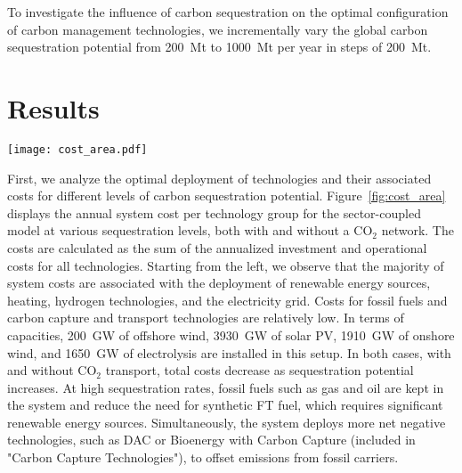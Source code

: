 \documentclass[conference]{IEEEtran}
\newcommand{\carbon}{CO$_2$ }
\begin{document}
To investigate the influence of carbon sequestration on the optimal configuration of carbon management technologies, we incrementally vary the global carbon sequestration potential from 200~Mt to 1000~Mt per year in steps of 200~Mt.

\section{Results}
\label{sec:results}

\begin{figure*}[hbt]
    \centering
    \texttt{[image: cost\_area.pdf]}
    \caption[short]{Total annual system cost for the sector-coupled system with different levels of carbon sequestration potential, with (left) and without (right) \carbon network. When increasing the annual sequestration of from 200~Mt to 1000~Mt, the system cost reduce up to 10\% in case of a network with \carbon transport. Due to an increased flexibility from fossil carriers with subsequent sequestration, the need for FT synthesis and H$_2$ electrolysis and the corresponding renewable power supply is reduced. }
    \label{fig:cost_area}
\end{figure*}

First, we analyze the optimal deployment of technologies and their associated costs for different levels of carbon sequestration potential. Figure~\ref{fig:cost_area} displays the annual system cost per technology group for the sector-coupled model at various sequestration levels, both with and without a \carbon network. The costs are calculated as the sum of the annualized investment and operational costs for all technologies. Starting from the left, we observe that the majority of system costs are associated with the deployment of renewable energy sources, heating, hydrogen technologies, and the electricity grid. Costs for fossil fuels and carbon capture and transport technologies are relatively low. In terms of capacities, 200~GW of offshore wind, 3930~GW of solar PV, 1910~GW of onshore wind, and 1650~GW of electrolysis are installed in this setup.
In both cases, with and without \carbon transport, total costs decrease as sequestration potential increases. At high sequestration rates, fossil fuels such as gas and oil are kept in the system and reduce the need for synthetic FT fuel, which requires significant renewable energy sources. Simultaneously, the system deploys more net negative technologies, such as DAC or Bioenergy with Carbon Capture (included in "Carbon Capture Technologies"), to offset emissions from fossil carriers.
\end{document}
